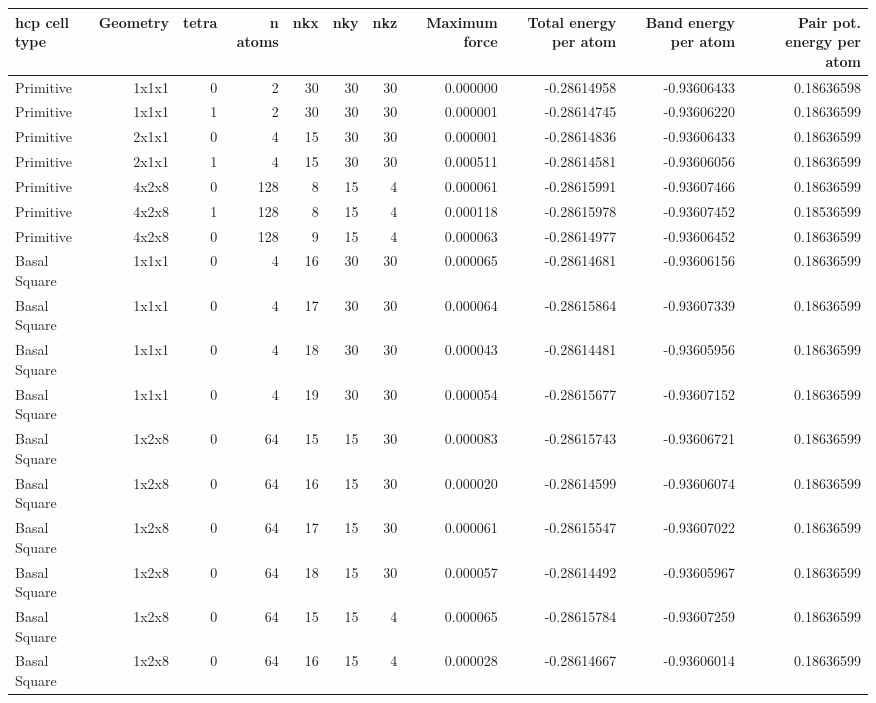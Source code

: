 \documentclass[11pt]{article}
\begin{document}
\begin{center}
\begin{tabular}{lrrrrrrrrrr}
hcp cell type & Geometry & tetra & n atoms & nkx & nky & nkz & Maximum force & Total energy per atom & Band energy per atom & Pair pot. energy per atom\\
\hline
Primitive & 1x1x1 & 0 & 2 & 30 & 30 & 30 & 0.000000 & -0.28614958 & -0.93606433 & 0.18636598\\
Primitive & 1x1x1 & 1 & 2 & 30 & 30 & 30 & 0.000001 & -0.28614745 & -0.93606220 & 0.18636599\\
Primitive & 2x1x1 & 0 & 4 & 15 & 30 & 30 & 0.000001 & -0.28614836 & -0.93606433 & 0.18636599\\
Primitive & 2x1x1 & 1 & 4 & 15 & 30 & 30 & 0.000511 & -0.28614581 & -0.93606056 & 0.18636599\\
Primitive & 4x2x8 & 0 & 128 & 8 & 15 & 4 & 0.000061 & -0.28615991 & -0.93607466 & 0.18636599\\
Primitive & 4x2x8 & 1 & 128 & 8 & 15 & 4 & 0.000118 & -0.28615978 & -0.93607452 & 0.18536599\\
Primitive & 4x2x8 & 0 & 128 & 9 & 15 & 4 & 0.000063 & -0.28614977 & -0.93606452 & 0.18636599\\
Basal Square & 1x1x1 & 0 & 4 & 16 & 30 & 30 & 0.000065 & -0.28614681 & -0.93606156 & 0.18636599\\
Basal Square & 1x1x1 & 0 & 4 & 17 & 30 & 30 & 0.000064 & -0.28615864 & -0.93607339 & 0.18636599\\
Basal Square & 1x1x1 & 0 & 4 & 18 & 30 & 30 & 0.000043 & -0.28614481 & -0.93605956 & 0.18636599\\
Basal Square & 1x1x1 & 0 & 4 & 19 & 30 & 30 & 0.000054 & -0.28615677 & -0.93607152 & 0.18636599\\
Basal Square & 1x2x8 & 0 & 64 & 15 & 15 & 30 & 0.000083 & -0.28615743 & -0.93606721 & 0.18636599\\
Basal Square & 1x2x8 & 0 & 64 & 16 & 15 & 30 & 0.000020 & -0.28614599 & -0.93606074 & 0.18636599\\
Basal Square & 1x2x8 & 0 & 64 & 17 & 15 & 30 & 0.000061 & -0.28615547 & -0.93607022 & 0.18636599\\
Basal Square & 1x2x8 & 0 & 64 & 18 & 15 & 30 & 0.000057 & -0.28614492 & -0.93605967 & 0.18636599\\
Basal Square & 1x2x8 & 0 & 64 & 15 & 15 & 4 & 0.000065 & -0.28615784 & -0.93607259 & 0.18636599\\
Basal Square & 1x2x8 & 0 & 64 & 16 & 15 & 4 & 0.000028 & -0.28614667 & -0.93606014 & 0.18636599\\

\end{tabular}
\end{center}
\end{document}
